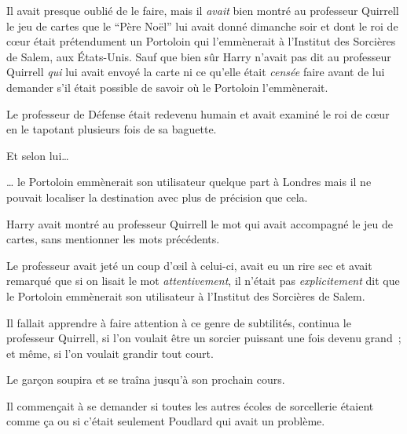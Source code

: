 Il avait presque oublié de le faire, mais il \emph{avait} bien montré au professeur Quirrell le jeu de cartes que le “Père Noël” lui avait donné dimanche soir et dont le roi de cœur était prétendument un Portoloin qui l'emmènerait à l'Institut des Sorcières de Salem, aux États-Unis. Sauf que bien sûr Harry n'avait pas dit au professeur Quirrell \emph{qui} lui avait envoyé la carte ni ce qu'elle était \emph{censée} faire avant de lui demander s'il était possible de savoir où le Portoloin l'emmènerait.

Le professeur de Défense était redevenu humain et avait examiné le roi de cœur en le tapotant plusieurs fois de sa baguette.

Et selon lui…

… le Portoloin emmènerait son utilisateur quelque part à Londres mais il ne pouvait localiser la destination avec plus de précision que cela.

Harry avait montré au professeur Quirrell le mot qui avait accompagné le jeu de cartes, sans mentionner les mots précédents.

Le professeur avait jeté un coup d'œil à celui-ci, avait eu un rire sec et avait remarqué que si on lisait le mot \emph{attentivement}, il n'était pas \emph{explicitement} dit que le Portoloin emmènerait son utilisateur à l'Institut des Sorcières de Salem.

Il fallait apprendre à faire attention à ce genre de subtilités, continua le professeur Quirrell, si l'on voulait être un sorcier puissant une fois devenu grand~; et même, si l'on voulait grandir tout court.

Le garçon soupira et se traîna jusqu'à son prochain cours.

Il commençait à se demander si toutes les autres écoles de sorcellerie étaient comme ça ou si c'était seulement Poudlard qui avait un problème.
